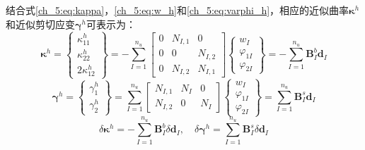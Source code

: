 结合式\eqref{ch_5:eq:kappa}，\eqref{ch_5:eq:w_h}和\eqref{ch_5:eq:varphi_h}，相应的近似曲率$\boldsymbol\kappa^h$和近似剪切应变$\boldsymbol\gamma^h$可表示为：
\begin{equation}
    \boldsymbol\kappa^h = 
    \begin{Bmatrix}
        \kappa^h_{11} \\ \kappa^h_{22} \\ 2\kappa^h_{12} 
    \end{Bmatrix} = -\sum_{I=1}^{n_u}
    \begin{bmatrix}
        0 & N_{I,1} & 0 \\ 0 & 0 & N_{I,2} \\ 0 & N_{I,2} & N_{I,1}
    \end{bmatrix}
    \begin{Bmatrix}
        w_I \\ \varphi_{1I} \\ \varphi_{2I}
    \end{Bmatrix} = - \sum_{I=1}^{n_u} \boldsymbol B^b_I \boldsymbol d_I
\end{equation}
\begin{equation}
    \boldsymbol\gamma^h = 
    \begin{Bmatrix}
        \gamma^h_1 \\ \gamma^h_2
    \end{Bmatrix} = \sum_{I=1}^{n_u}
    \begin{bmatrix}
        N_{I,1} & N_I & 0 \\
        N_{I,2} & 0 & N_I
    \end{bmatrix}
    \begin{Bmatrix}
        w_I \\ \varphi_{1I} \\ \varphi_{2I}
    \end{Bmatrix} = \sum_{I=1}^{n_u} \boldsymbol B^s_I \boldsymbol d_I
\end{equation}
\begin{equation}\label{ch_5:eq:kappa_h}
    \delta\boldsymbol\kappa^h = - \sum_{I=1}^{n_u} \boldsymbol B^b_I \delta\boldsymbol d_I ,\quad \delta\boldsymbol\gamma^h = \sum_{I=1}^{n_u} \boldsymbol B^s_I \delta\boldsymbol d_I
\end{equation}

